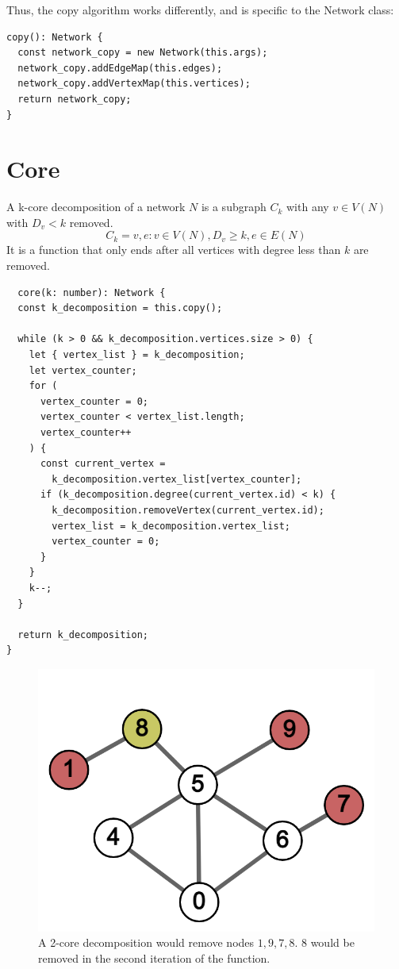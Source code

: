 Thus, the copy algorithm works differently, and is specific to the Network class:

\begin{verbatim}
copy(): Network {
  const network_copy = new Network(this.args);
  network_copy.addEdgeMap(this.edges);
  network_copy.addVertexMap(this.vertices);
  return network_copy;
}
\end{verbatim}

\section{Core}

A k-core decomposition of a network $N$ is a subgraph $C_k$ with any
$v\in V(N)$ with $D_v<k$ removed.
$$C_k={v,e:v\in V(N), D_v\geq k,e\in E(N)}$$
It is a function that only ends after all vertices with degree less than $k$ are removed.

\begin{verbatim}
  core(k: number): Network {
  const k_decomposition = this.copy();

  while (k > 0 && k_decomposition.vertices.size > 0) {
    let { vertex_list } = k_decomposition;
    let vertex_counter;
    for (
      vertex_counter = 0;
      vertex_counter < vertex_list.length;
      vertex_counter++
    ) {
      const current_vertex =
        k_decomposition.vertex_list[vertex_counter];
      if (k_decomposition.degree(current_vertex.id) < k) {
        k_decomposition.removeVertex(current_vertex.id);
        vertex_list = k_decomposition.vertex_list;
        vertex_counter = 0;
      }
    }
    k--;
  }

  return k_decomposition;
}
\end{verbatim}

\begin{figure}[H]
  \includegraphics[scale=.25]{img/core_ex.png}
  \caption{A 2-core decomposition would remove nodes $1,9,7,8$. $8$ would be removed in the second iteration of the function.}
  \label{fig:core_ex}
\end{figure}


